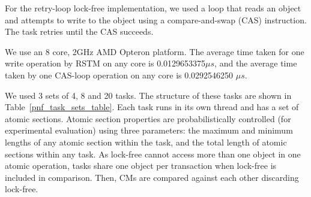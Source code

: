 \documentclass[12pt,english]{report}
\begin{document}
For the retry-loop lock-free implementation,
we used a loop that reads an object and attempts to write to the object using a compare-and-swap (CAS) instruction. The task retries until the CAS succeeds. 

We use an 8 core, 2GHz AMD Opteron platform. The average time
taken for one write operation by RSTM on any
core is 0.0129653375$\mu s$, and the average time taken
by one CAS-loop operation on any core is 0.0292546250 $\mu s$.

We used 3 sets of 4, 8 and 20 tasks. The structure of these tasks are shown in Table~\ref{pnf_task_sets_table}. Each task runs in its own thread and has a set of atomic sections. Atomic section properties are probabilistically controlled (for experimental evaluation) using three parameters: the maximum and minimum lengths of any atomic section within the task, and the total length of atomic sections within any task. As lock-free cannot access more than one object in one atomic operation, tasks share one object per transaction when lock-free is included in comparison. Then, CMs are compared against each other discarding lock-free.
\end{document}
